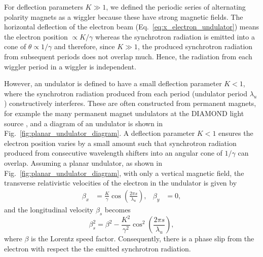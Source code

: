 \documentclass[../main.tex]{subfiles}
\begin{document}
For deflection parameters $K \gg 1$, we defined the periodic series of alternating polarity magnets as a wiggler because these have strong magnetic fields. The horizontal deflection of the electron beam (Eq.~\ref{eq:x_electron_undulator}) means the electron position $\propto K/\gamma$ whereas the synchrotron radiation is emitted into a cone of $\theta \propto 1/\gamma$ and therefore, since $K \gg 1$, the produced synchrotron radiation from subsequent periods does not overlap much. Hence, the radiation from each wiggler period in a wiggler is independent.

However, an undulator is defined to have a small deflection parameter $K < 1$, where the synchrotron radiation produced from each period (undulator period $\lambda_{u}$) constructively interferes. These are often constructed from permanent magnets, for example the many permanent magnet undulators at the DIAMOND light source \cite{materlik2015diamond}, and a diagram of an undulator is shown in Fig.~\ref{fig:planar_undulator_diagram}. A deflection parameter $K < 1$ ensures the electron position varies by a small amount such that synchrotron radiation produced from consecutive wavelength shifters into an angular cone of $1/\gamma$ can overlap. Assuming a planar undulator, as shown in Fig.~\ref{fig:planar_undulator_diagram}, with only a vertical magnetic field, the transverse relativistic velocities of the electron in the undulator is given by
\begin{align}
\beta_{x} &= \frac{K}{\gamma}\cos\left(\frac{2\pi s}{\lambda_{u}}\right), & \beta_{y} &= 0,
\label{eq:transverse_undulator_velocity}    
\end{align}
and the longitudinal velocity $\beta_{s}$ becomes
\begin{equation}
\beta_{s}^{2} = \beta^{2}-\frac{K^{2}}{\gamma^{2}}\cos^{2}\left(\frac{2\pi s}{\lambda_{u}}\right),
\label{eq:longitudinal_undulator_velocity}
\end{equation}
where $\beta$ is the Lorentz speed factor. Consequently, there is a phase slip from the electron with respect the the emitted synchrotron radiation.
\end{document}
